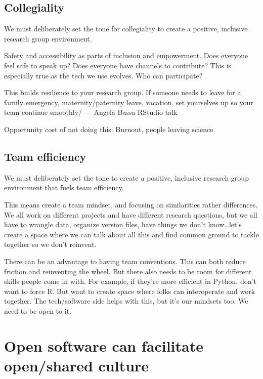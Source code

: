 \documentclass[
  letterpaper,
  DIV=11,
  numbers=noendperiod]{scrreprt}
\begin{document}
\hypertarget{collegiality}{%
\subsection{Collegiality}\label{collegiality}}

We must deliberately set the tone for collegiality to create a positive,
inclusive research group environment.

Safety and accessibility as parts of inclusion and empowerment. Does
everyone feel safe to speak up? Does everyone have channels to
contribute? This is especially true as the tech we use evolves. Who can
participate?

This builds resilience to your research group. If someone needs to leave
for a family emergency, maternity/paternity leave, vacation, set
yourselves up so your team continue smoothly/ --- Angela Bassa RStudio
talk

Opportunity cost of not doing this. Burnout, people leaving science.

\hypertarget{team-efficiency}{%
\subsection{Team efficiency}\label{team-efficiency}}

We must deliberately set the tone to create a positive, inclusive
research group environment that fuels team efficiency.

This means create a team mindset, and focusing on similarities rather
differences. We all work on different projects and have different
research questions, but we all have to wrangle data, organize version
files, have things we don't know\ldots let's create a space where we can
talk about all this and find common ground to tackle together so we
don't reinvent.

There can be an advantage to having team conventions. This can both
reduce friction and reinventing the wheel. But there also needs to be
room for different skills people come in with. For example, if they're
more efficient in Python, don't want to force R. But want to create
space where folks can interoperate and work together. The tech/software
side helps with this, but it's our mindsets too. We need to be open to
it.

\hypertarget{open-software-can-facilitate-openshared-culture}{%
\section{Open software can facilitate open/shared
culture}\label{open-software-can-facilitate-openshared-culture}}
\end{document}

